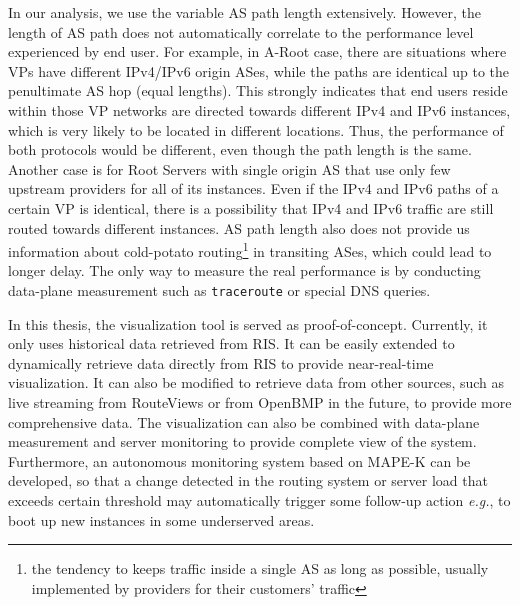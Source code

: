 In our analysis, we use the variable AS path length extensively. However, the length of AS path does not automatically correlate to the performance level experienced by end user. For example, in A-Root case, there are situations where VPs have different IPv4/IPv6 origin ASes, while the paths are identical up to the penultimate AS hop (equal lengths). This strongly indicates that end users reside within those VP networks are directed towards different IPv4 and IPv6 instances, which is very likely to be located in different locations. Thus, the performance of both protocols would be different, even though the path length is the same. Another case is for Root Servers with single origin AS that use only few upstream providers for all of its instances. Even if the IPv4 and IPv6 paths of a certain VP is identical, there is a possibility that IPv4 and IPv6 traffic are still routed towards different instances. AS path length also does not provide us information about cold-potato routing\footnote{the tendency to keeps traffic inside a single AS as long as possible, usually implemented by providers for their customers' traffic} in transiting ASes, which could lead to longer delay. The only way to measure the real performance is by conducting data-plane measurement such as \texttt{traceroute} or special DNS queries. 

In this thesis, the visualization tool is served as proof-of-concept. Currently, it only uses historical data retrieved from RIS. It can be easily extended to dynamically retrieve data directly from RIS to provide near-real-time visualization. It can also be modified to retrieve data from other sources, such as live streaming from RouteViews or from OpenBMP in the future, to provide more comprehensive data. The visualization can also be combined with data-plane measurement and server monitoring to provide complete view of the system. Furthermore, an autonomous monitoring system based on MAPE-K \cite{computing2003architectural} can be developed, so that a change detected in the routing system or server load that exceeds certain threshold may automatically trigger some follow-up action \textit{e.g.}, to boot up new instances in some underserved areas.